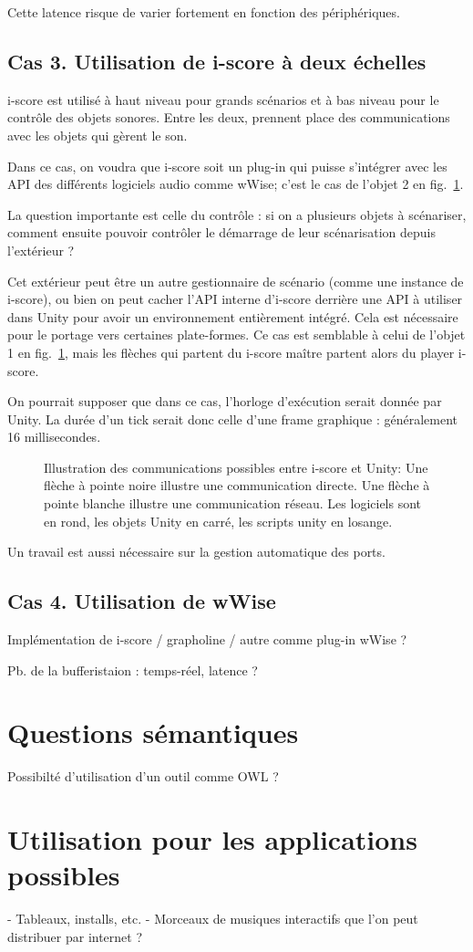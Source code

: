 \documentclass[french,12pt,a4paper]{article}
\begin{document}
Cette latence risque de varier fortement en fonction des périphériques. 

\subsection{Cas 3. Utilisation de i-score à deux échelles}
i-score est utilisé à haut niveau pour grands scénarios et à bas niveau pour le contrôle des objets sonores.
Entre les deux, prennent place des communications avec les objets qui gèrent le son.

Dans ce cas, on voudra que i-score soit un plug-in qui puisse s'intégrer avec les API des différents logiciels audio comme wWise; c'est le cas de l'objet 2 en fig.~\ref{fig.com.iscore.unity}.

La question importante est celle du contrôle : si on a plusieurs objets à scénariser, comment 
ensuite pouvoir contrôler le démarrage de leur scénarisation depuis l'extérieur ? 

Cet extérieur peut être un autre gestionnaire de scénario (comme une instance de i-score), ou bien 
on peut cacher l'API interne d'i-score derrière une API à utiliser dans Unity pour avoir un environnement entièrement intégré. 
Cela est nécessaire pour le portage vers certaines plate-formes. Ce cas est semblable à celui de l'objet 1 en fig.~\ref{fig.com.iscore.unity}, mais les flèches qui partent du i-score maître partent alors du player i-score.

On pourrait supposer que dans ce cas, l'horloge d'exécution serait donnée par Unity. 
La durée d'un tick serait donc celle d'une frame graphique : généralement 16 millisecondes.

\begin{figure}
    \centering
	\scalebox{0.6}{}
    \caption{Illustration des communications possibles entre i-score et Unity:
        Une flèche à pointe noire illustre une communication directe. Une flèche à pointe blanche illustre une communication réseau. Les logiciels sont en rond, les objets Unity en carré, les scripts unity en losange.}
    \label{fig.com.iscore.unity}
\end{figure}

Un travail est aussi nécessaire sur la gestion automatique des ports.
\subsection{Cas 4. Utilisation de wWise }
Implémentation de i-score / grapholine / autre comme plug-in wWise ?

Pb. de la bufferistaion : temps-réel, latence ?

\section{Questions sémantiques}
Possibilté d'utilisation d'un outil comme OWL ?

\section{Utilisation pour les applications possibles}
- Tableaux, installs, etc.
- Morceaux de musiques interactifs que l'on peut distribuer par internet ?
\end{document}
